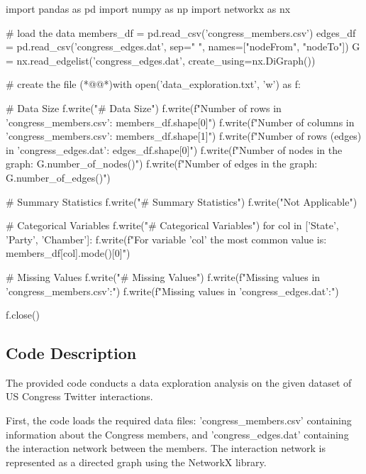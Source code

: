 \documentclass[11pt]{article}
\begin{document}
\begin{python}

import pandas as pd
import numpy as np
import networkx as nx

# load the data
members_df = pd.read_csv('congress_members.csv')
edges_df = pd.read_csv('congress_edges.dat', sep=" ", names=["nodeFrom", "nodeTo"])
G = nx.read_edgelist('congress_edges.dat', create_using=nx.DiGraph())

# create the file
(*@@*)with open('data_exploration.txt', 'w') as f:

    # Data Size
    f.write("# Data Size\n")
    f.write(f"Number of rows in 'congress_members.csv': {members_df.shape[0]}\n")
    f.write(f"Number of columns in 'congress_members.csv': {members_df.shape[1]}\n")
    f.write(f"Number of rows (edges) in 'congress_edges.dat': {edges_df.shape[0]}\n")
    f.write(f"Number of nodes in the graph: {G.number_of_nodes()}\n")
    f.write(f"Number of edges in the graph: {G.number_of_edges()}\n")

    # Summary Statistics
    f.write("\n# Summary Statistics\n")
    f.write("Not Applicable\n")

    # Categorical Variables
    f.write("\n# Categorical Variables\n")
    for col in ['State', 'Party', 'Chamber']:
        f.write(f"For variable '{col}' the most common value is: {members_df[col].mode()[0]}\n")

    # Missing Values
    f.write("\n# Missing Values\n")
    f.write(f"Missing values in 'congress_members.csv':\n")
    f.write(f"Missing values in 'congress_edges.dat':\n")

f.close()

\end{python}

\subsection{Code Description}

The provided code conducts a data exploration analysis on the given dataset of US Congress Twitter interactions. 

First, the code loads the required data files: 'congress\_members.csv' containing information about the Congress members, and 'congress\_edges.dat' containing the interaction network between the members. The interaction network is represented as a directed graph using the NetworkX library.
\end{document}
